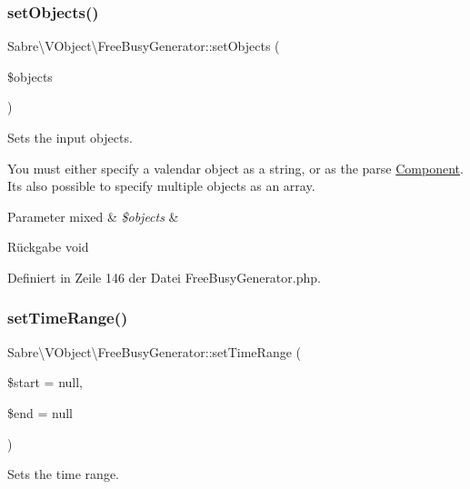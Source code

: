 \subsubsection{\texorpdfstring{set\+Objects()}{setObjects()}}
{\footnotesize\ttfamily Sabre\textbackslash{}\+V\+Object\textbackslash{}\+Free\+Busy\+Generator\+::set\+Objects (\begin{DoxyParamCaption}\item[{}]{\$objects }\end{DoxyParamCaption})}

Sets the input objects.

You must either specify a valendar object as a string, or as the parse \mbox{\hyperlink{class_sabre_1_1_v_object_1_1_component}{Component}}. It\textquotesingle{}s also possible to specify multiple objects as an array.


\begin{DoxyParams}[1]{Parameter}
mixed & {\em \$objects} & \\
\hline
\end{DoxyParams}
\begin{DoxyReturn}{Rückgabe}
void 
\end{DoxyReturn}


Definiert in Zeile 146 der Datei Free\+Busy\+Generator.\+php.

\mbox{\label{class_sabre_1_1_v_object_1_1_free_busy_generator_abf94767db5f35fff4b03cdf5b3153f89}} 
\subsubsection{\texorpdfstring{set\+Time\+Range()}{setTimeRange()}}
{\footnotesize\ttfamily Sabre\textbackslash{}\+V\+Object\textbackslash{}\+Free\+Busy\+Generator\+::set\+Time\+Range (\begin{DoxyParamCaption}\item[{Date\+Time\+Interface}]{\$start = {\ttfamily null},  }\item[{Date\+Time\+Interface}]{\$end = {\ttfamily null} }\end{DoxyParamCaption})}

Sets the time range.

